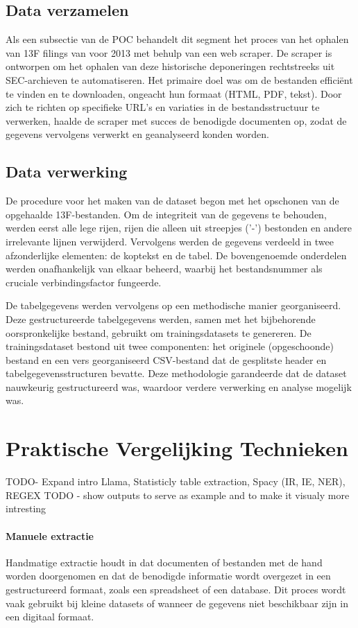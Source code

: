 \subsection{Data verzamelen}
Als een subsectie van de POC behandelt dit segment het proces van het ophalen van 13F filings van voor 2013 met behulp van een web scraper. De scraper is ontworpen om het ophalen van deze historische deponeringen rechtstreeks uit SEC-archieven te automatiseren. Het primaire doel was om de bestanden efficiënt te vinden en te downloaden, ongeacht hun formaat (HTML, PDF, tekst). Door zich te richten op specifieke URL's en variaties in de bestandsstructuur te verwerken, haalde de scraper met succes de benodigde documenten op, zodat de gegevens vervolgens verwerkt en geanalyseerd konden worden.
\subsection{Data verwerking}
De procedure voor het maken van de dataset begon met het opschonen van de opgehaalde 13F-bestanden. Om de integriteit van de gegevens te behouden, werden eerst alle lege rijen, rijen die alleen uit streepjes ('-') bestonden en andere irrelevante lijnen verwijderd. Vervolgens werden de gegevens verdeeld in twee afzonderlijke elementen: de koptekst en de tabel. De bovengenoemde onderdelen werden onafhankelijk van elkaar beheerd, waarbij het bestandsnummer als cruciale verbindingsfactor fungeerde.

De tabelgegevens werden vervolgens op een methodische manier georganiseerd. Deze gestructureerde tabelgegevens werden, samen met het bijbehorende oorspronkelijke bestand, gebruikt om trainingsdatasets te genereren. De trainingsdataset bestond uit twee componenten: het originele (opgeschoonde) bestand en een vers georganiseerd CSV-bestand dat de gesplitste header en tabelgegevensstructuren bevatte. Deze methodologie garandeerde dat de dataset nauwkeurig gestructureerd was, waardoor verdere verwerking en analyse mogelijk was.




\section{Praktische Vergelijking Technieken}
TODO- Expand intro
Llama, Statisticly table extraction, Spacy (IR, IE, NER), REGEX
TODO - show outputs to serve as example and to make it visualy more intresting
\paragraph{Manuele extractie}
Handmatige extractie houdt in dat documenten of bestanden met de hand worden doorgenomen en dat de benodigde informatie wordt overgezet in een gestructureerd formaat, zoals een spreadsheet of een database. Dit proces wordt vaak gebruikt bij kleine datasets of wanneer de gegevens niet beschikbaar zijn in een digitaal formaat.

